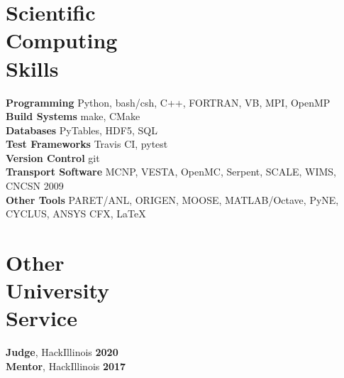\documentclass[margin,line]{resume}
\begin{document}
\begin{resume}
    \section{\mysidestyle Scientific\\Computing\\Skills}
                \textbf{Programming} \hfill Python, bash/csh, C++, FORTRAN, 
                VB, MPI, OpenMP \vspace{.5mm}\\%
                \textbf{Build Systems} \hfill make, CMake\vspace{.5mm}\\%
                \textbf{Databases} \hfill PyTables, HDF5, SQL\vspace{.5mm}\\%
                \textbf{Test Frameworks} \hfill Travis CI, 
                pytest\vspace{.5mm}\\%
                \textbf{Version Control} \hfill git\vspace{.5mm}\\%
                \textbf{Transport Software} \hfill MCNP, VESTA, OpenMC, Serpent,
                SCALE, WIMS, CNCSN 2009 \vspace{.5mm}\\%
                \textbf{Other Tools} \hfill  PARET/ANL, ORIGEN, MOOSE, MATLAB/Octave, PyNE, 
                CYCLUS, ANSYS CFX, \LaTeX \vspace{.5mm}%

    \section{\mysidestyle Other\\University\\Service}
		\textbf{Judge}, HackIllinois \hfill \textbf{2020}\vspace{.5mm}\\%
		\textbf{Mentor}, HackIllinois \hfill 
		\textbf{2017}\vspace{.5mm}\\%


\end{resume}
\end{document}
